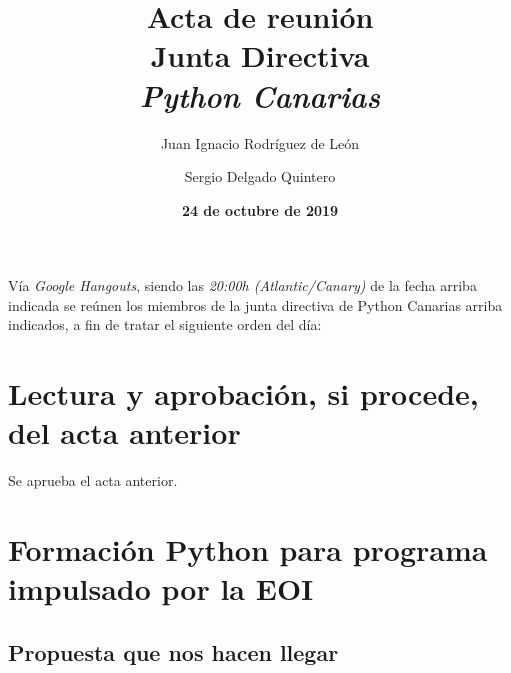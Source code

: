 \documentclass[a4paper, 12pt]{article}
\title{\huge \textbf{Acta de reunión} \\ Junta Directiva \\ \textit{Python Canarias}}
\date{\textbf{24 de octubre de 2019}}
\author{
    Juan Ignacio Rodríguez de León \and 
    Sergio Delgado Quintero
}
\begin{document}
\renewcommand{\contentsname}{Orden del día}

\maketitle

Vía \textit{Google Hangouts}, siendo las \textit{20:00h (Atlantic/Canary)} de la fecha arriba indicada se reúnen los miembros de la junta directiva de Python Canarias arriba indicados, a fin de tratar el siguiente orden del día:

\tableofcontents

\section{Lectura y aprobación, si procede, del acta anterior}

Se aprueba el acta anterior.

\section{Formación Python para programa impulsado por la EOI}

\subsection*{Propuesta que nos hacen llegar}
\end{document}
